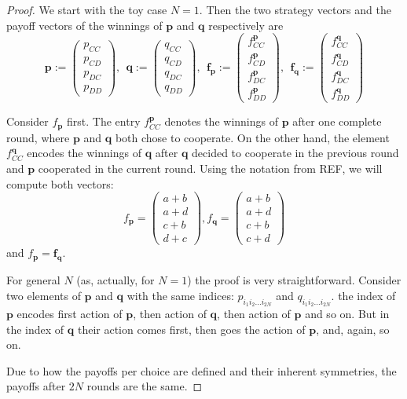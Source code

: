 \documentclass[10pt,a4paper]{amsart}
\def\f{\mathbf{f}}
\def\p{\mathbf{p}}
\def\q{\mathbf{q}}
\begin{document}
\begin{proof}
    We start with the toy case $N=1$. Then the two strategy vectors and the payoff vectors of the winnings of $\p$ and $\q$ respectively  are
    \[
    \p:=\begin{pmatrix}
        p_{CC}\\
        p_{CD}\\
        p_{DC}\\
        p_{DD}
    \end{pmatrix}, \ \ \q:=\begin{pmatrix}
        q_{CC}\\
        q_{CD}\\
        q_{DC}\\
        q_{DD}
    \end{pmatrix}, \ \ \f_{\p}:=\begin{pmatrix}
        f_{CC}^{\p}\\
        f_{CD}^{\p}\\
        f_{DC}^{\p}\\
        f_{DD}^{\p}
    \end{pmatrix}, \ \ \f_{\q}:=\begin{pmatrix}
        f_{CC}^{\q}\\
        f_{CD}^{\q}\\
        f_{DC}^{\q}\\
        f_{DD}^{\q}
    \end{pmatrix}
    \]

    Consider $f_{\p}$ first. The entry $f_{CC}^{\p}$ denotes the winnings of $\p$ after one complete round, where $\p$ and $\q$ both chose to cooperate. On the other hand, the element $f^{\q}_{CC}$ encodes the winnings of $\q$ after $\q$ decided to cooperate in the previous round and $\p$ cooperated in the current round. Using the notation from REF, we will compute both vectors:
    \[
    f_{\p} =\begin{pmatrix}
        a + b\\
        a + d\\
        c + b\\
        d + c
    \end{pmatrix},    f_{\q} =\begin{pmatrix}
      a + b\\
       a + d\\
       c+b\\
       c+d
    \end{pmatrix}
    \] 
    and $f_{\p} = \f_{\q}$. 

    For general $N$ (as, actually, for $N=1$) the proof is very straightforward. Consider two elements of $\p$ and $\q$ with the same indices: $p_{i_1i_2\ldots i_{2N}}$ and $q_{i_1i_2\ldots i_{2N}}$.  the index of $\p$ encodes first action of $\p$, then action of $\q$, then action of $\p$ and so on.  But in the index of $\q$ their action comes first, then goes the action of $\p$, and, again, so on. 

    Due to how the payoffs per choice are defined and their inherent symmetries, the payoffs after $2N$ rounds are the same. 
\end{proof}
\end{document}
